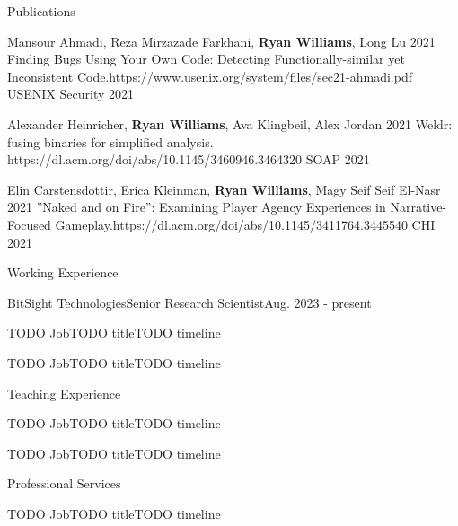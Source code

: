 \documentclass[]{cv}
\begin{document}
\begin{section}{Publications}
\begin{pub}
    {Mansour Ahmadi, Reza Mirzazade Farkhani, \textbf{Ryan Williams}, Long Lu}
    {2021}
    {Finding Bugs Using Your Own Code: Detecting Functionally-similar yet Inconsistent Code.}{https://www.usenix.org/system/files/sec21-ahmadi.pdf}
    {USENIX Security 2021}
\end{pub}

\begin{pub}
    {Alexander Heinricher, \textbf{Ryan Williams}, Ava Klingbeil, Alex Jordan}
    {2021}
    {Weldr: fusing binaries for simplified analysis.}
    {https://dl.acm.org/doi/abs/10.1145/3460946.3464320}
    {SOAP 2021}
\end{pub}

\begin{pub}
    {Elin Carstensdottir, Erica Kleinman, \textbf{Ryan Williams}, Magy Seif Seif El-Nasr}
    {2021}
    {”Naked and on Fire”: Examining Player Agency Experiences in Narrative-Focused Gameplay.}{https://dl.acm.org/doi/abs/10.1145/3411764.3445540}
    {CHI 2021}
\end{pub}
    
\end{section}

\begin{section}{Working Experience}
\begin{subsectionnobullet}{BitSight Technologies}{Senior Research Scientist}{Aug. 2023 - present}
\end{subsectionnobullet}

\begin{subsectionnobullet}{TODO Job}{TODO title}{TODO timeline}
\end{subsectionnobullet}

\begin{subsectionnobullet}{TODO Job}{TODO title}{TODO timeline}
\end{subsectionnobullet}

\end{section}

\begin{section}{Teaching Experience}

\begin{subsectionnobullet}{TODO Job}{TODO title}{TODO timeline}
\end{subsectionnobullet}

\begin{subsectionnobullet}{TODO Job}{TODO title}{TODO timeline}
\end{subsectionnobullet}

\end{section}

\begin{section}{Professional Services}

\begin{subsectionnobullet}{TODO Job}{TODO title}{TODO timeline}
\end{subsectionnobullet}

\end{section}

\end{document}
